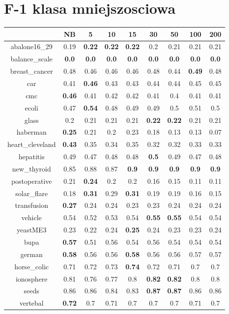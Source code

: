 \documentclass{article}%
\begin{document}
%
\section*{F{-}1 klasa mniejszosciowa}%
\begin{tabular}{c|cccccccc}%
\hline%
&NB&5&10&15&30&50&100&200\\%
\hline%
abalone16\_29&0.19&\textbf{0.22}&\textbf{0.22}&\textbf{0.22}&0.2&0.21&0.21&0.21\\%
\hline%
balance\_scale&\textbf{0.0}&\textbf{0.0}&\textbf{0.0}&\textbf{0.0}&\textbf{0.0}&\textbf{0.0}&\textbf{0.0}&\textbf{0.0}\\%
\hline%
breast\_cancer&0.48&0.46&0.46&0.46&0.48&0.44&\textbf{0.49}&0.48\\%
\hline%
car&0.41&\textbf{0.46}&0.43&0.43&0.44&0.44&0.45&0.45\\%
\hline%
cmc&\textbf{0.46}&0.41&0.42&0.42&0.41&0.4&0.41&0.41\\%
\hline%
ecoli&0.47&\textbf{0.54}&0.48&0.49&0.49&0.5&0.51&0.5\\%
\hline%
glass&0.2&0.21&0.21&0.21&\textbf{0.22}&\textbf{0.22}&0.21&0.21\\%
\hline%
haberman&\textbf{0.25}&0.21&0.2&0.23&0.18&0.13&0.13&0.07\\%
\hline%
heart\_cleveland&\textbf{0.43}&0.35&0.34&0.35&0.32&0.32&0.33&0.33\\%
\hline%
hepatitis&0.49&0.47&0.48&0.48&\textbf{0.5}&0.49&0.47&0.48\\%
\hline%
new\_thyroid&0.85&0.88&0.87&\textbf{0.9}&\textbf{0.9}&\textbf{0.9}&\textbf{0.9}&\textbf{0.9}\\%
\hline%
postoperative&0.21&\textbf{0.24}&0.2&0.2&0.16&0.15&0.11&0.11\\%
\hline%
solar\_flare&0.18&\textbf{0.31}&0.29&\textbf{0.31}&0.19&0.19&0.16&0.15\\%
\hline%
transfusion&\textbf{0.27}&0.24&0.24&0.23&0.23&0.24&0.24&0.24\\%
\hline%
vehicle&0.54&0.52&0.53&0.54&\textbf{0.55}&\textbf{0.55}&0.54&0.54\\%
\hline%
yeastME3&0.23&0.22&0.24&\textbf{0.25}&0.24&0.23&0.23&0.24\\%
\hline%
bupa&\textbf{0.57}&0.51&0.56&0.54&0.56&0.54&0.54&0.54\\%
\hline%
german&\textbf{0.58}&0.56&0.56&\textbf{0.58}&0.56&0.56&0.57&0.57\\%
\hline%
horse\_colic&0.71&0.72&0.73&\textbf{0.74}&0.72&0.71&0.7&0.7\\%
\hline%
ionosphere&0.81&0.76&0.77&0.8&\textbf{0.82}&\textbf{0.82}&0.8&0.8\\%
\hline%
seeds&0.86&0.86&0.84&0.83&\textbf{0.87}&\textbf{0.87}&0.86&0.86\\%
\hline%
vertebal&\textbf{0.72}&0.7&0.71&0.7&0.7&0.7&0.71&0.7\\%
\hline%
\end{tabular}
\end{document}
